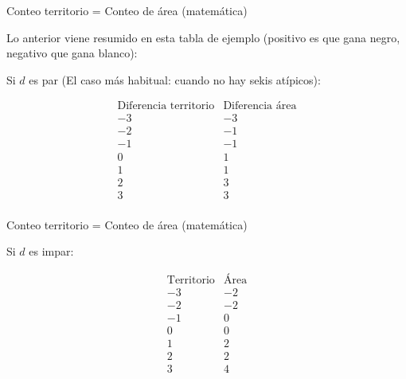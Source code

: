 \documentclass{beamer}
\begin{document}
\begin{frame}{Conteo territorio = Conteo de área (matemática)}

Lo anterior viene resumido en esta tabla de ejemplo (positivo es que gana negro, negativo que gana blanco):
  
  Si $d$ es par (El caso más habitual: cuando no hay sekis atípicos):
  
  $$\begin{array}{cc}
      \mbox{Diferencia territorio} & \mbox{Diferencia área} \\
      -3 & -3 \\
      -2 & -1 \\
      -1 & -1 \\
      0 & 1 \\
      1 & 1 \\
      2 & 3 \\
      3 & 3 \\
  \end{array}$$

\end{frame}

\begin{frame}{Conteo territorio = Conteo de área (matemática)}

Si $d$ es impar:
  
  $$\begin{array}{cc}
      \mbox{Territorio} & \mbox{Área} \\
      -3 & -2 \\
      -2 & -2 \\
      -1 & 0 \\
      0 & 0 \\
      1 & 2 \\
      2 & 2 \\
      3 & 4 \\
  \end{array}$$  
  
\end{frame}
\end{document}
